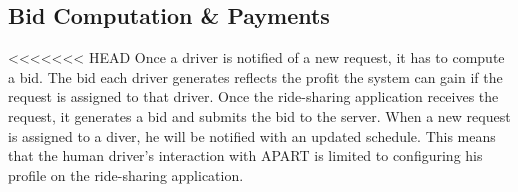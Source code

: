 \subsection{Bid Computation \& Payments}
\label{subsec:bidcomp}

<<<<<<< HEAD
Once a driver is notified of a new request, it has to compute a bid. The bid each driver generates reflects the profit the system can gain if the request is assigned to that driver. Once the ride-sharing application receives the request, it generates a bid and submits the bid to the server. When a new request is assigned to a diver, he will be notified with an updated schedule. This means that the human driver's interaction with APART is limited to configuring his profile on the ride-sharing application.

%
%
